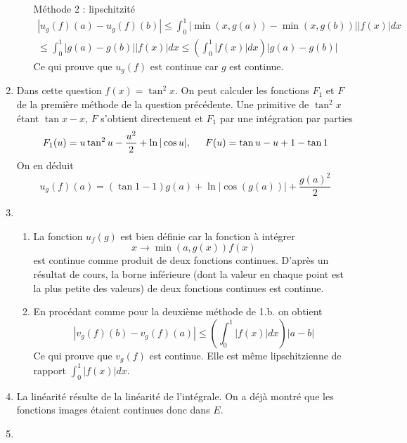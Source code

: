 \begin{enumerate}
\begin{enumerate}
Méthode 2 : lipschitzité
\begin{multline*}
 \left \vert u_g(f)(a) -u_g(f)(b) \right \vert 
\leq \int _0 ^1 \left\vert \min(x,g(a))-\min(x,g(b)) \right\vert  |f(x)|dx \\
\leq \int _0 ^1 \left\vert g(a)-g(b) \right\vert  |f(x)|dx
\leq \left( \int _0 ^1 |f(x)|dx\right)  \left\vert g(a)-g(b) \right\vert  
\end{multline*}
Ce qui prouve que $u_g(f)$ est continue car $g$ est continue.
\end{enumerate}
\item Dans cette question $f(x)=\tan^2 x$. On peut calculer les fonctions $F_1$ et $F$ de la première méthode de la question précédente. Une primitive de $\tan^2 x$ étant $\tan x -x$, $F$ s'obtient directement et $F_1$ par une intégration par parties
\begin{displaymath}
 F_1(u) =u\tan^2u -\frac{u^2}{2}+\ln |\cos u|, \hspace{0.5cm}
F(u) =\tan u -u +1-\tan 1
\end{displaymath}
On en déduit 
\begin{displaymath}
 u_g(f)(a)=(\tan 1 -1)g(a) + \ln\left \vert \cos(g(a))\right\vert+\frac{g(a)^2}{2} 
\end{displaymath}
\item \begin{enumerate}
 \item La fonction $u_f(g)$ est bien définie car la fonction à intégrer 
\begin{displaymath}
 x\rightarrow \min(a,g(x))f(x)
\end{displaymath}
est continue comme produit de deux fonctions continues. D'après un résultat de cours, la borne inférieure (dont la valeur en chaque point est la plus petite des valeurs) de deux fonctions continues est continue. 
\item En procédant comme pour la deuxième méthode de 1.b. on obtient
\begin{displaymath}
 |v_g(f)(b)-v_g(f)(a)|\leq \left( \int _0 ^1 |f(x)|dx\right)  \left\vert a-b \right\vert 
\end{displaymath}
Ce qui prouve que $v_g(f)$ est continue. Elle est même lipschitzienne de rapport $\int _0 ^1 |f(x)|dx$.
\end{enumerate}
\item La linéarité résulte de la linéarité de l'intégrale. On a déjà montré que les fonctions images étaient continues donc dans $E$.
\item \begin{enumerate}

\end{enumerate}
\end{enumerate}
